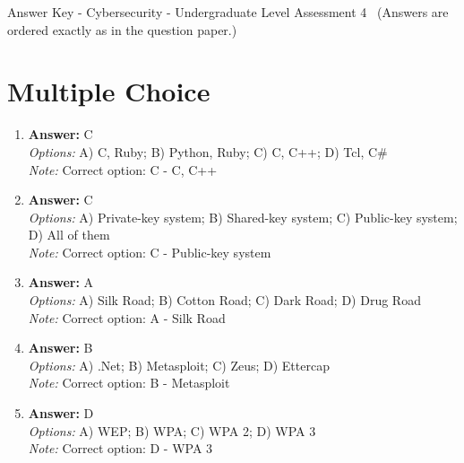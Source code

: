\documentclass[12pt]{article}
\begin{document}
\begin{center}
Answer Key - Cybersecurity - Undergraduate Level Assessment 4 \
\small (Answers are ordered exactly as in the question paper.)
\end{center}

\section*{Multiple Choice}
\begin{enumerate}[label=\arabic*.]
\item \textbf{Answer:} C
\\ \textit{Options:} A) C, Ruby; B) Python, Ruby; C) C, C++; D) Tcl, C\#
\\ \textit{Note:} Correct option: C - C, C++
\item \textbf{Answer:} C
\\ \textit{Options:} A) Private-key system; B) Shared-key system; C) Public-key system; D) All of them
\\ \textit{Note:} Correct option: C - Public-key system
\item \textbf{Answer:} A
\\ \textit{Options:} A) Silk Road; B) Cotton Road; C) Dark Road; D) Drug Road
\\ \textit{Note:} Correct option: A - Silk Road
\item \textbf{Answer:} B
\\ \textit{Options:} A) .Net; B) Metasploit; C) Zeus; D) Ettercap
\\ \textit{Note:} Correct option: B - Metasploit
\item \textbf{Answer:} D
\\ \textit{Options:} A) WEP; B) WPA; C) WPA 2; D) WPA 3
\\ \textit{Note:} Correct option: D - WPA 3
\end{enumerate}
\end{document}
